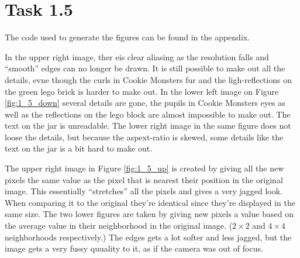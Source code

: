\section{Task 1.5}
The code used to generate the figures can be found in the appendix.

In the upper right image, ther eis clear aliasing as the resolution falls and
``smooth'' edges can no longer be drawn. It is still possible to make out all
the details, evne though the curls in Cookie Monsters fur and the
ligh-reflections on the green lego brick is harder to make out.  In the lower
left image on Figure \ref{fig:1_5_down} several details are gone, the pupils in
Cookie Monsters eyes as well as the reflections on the lego block are almost
impossible to make out. The text on the jar is unreadable. The lower right image
in the same figure does not loose the details, but because the aspext-ratio is
skewed, some details like the text on the jar is a bit hard to make out.


The upper right image in Figure \ref{fig:1_5_up} is created by giving all the
new pixels the same value as the pixel that is nearest their position in the
original image. This essentially ``stretches'' all the pixels and gives a very
jagged look. When comparing it to the original they're identical since they're
displayed in the same size. The two lower figures are taken by giving new pixels
a value based on the average value in their neighborhood in the original
image. ($2\times 2$ and $4\times 4$ neighborhoods respectively.) The edges gets
a lot softer and less jagged, but the image gets a very fussy quuality to it, as
if the camera was out of focus.
